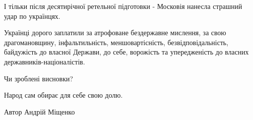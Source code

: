 І тільки після десятирічної ретельної підготовки - Московія нанесла страшний
удар по українцях. 

Українці дорого заплатили за атрофоване бездержавне мислення, за свою
драгомановщину, інфальтильність, меншовартісність, безвідповідальність,
байдужість до власної Держави, до себе, ворожість та упередженість до власних
державників-націоналістів. 

Чи зроблені висновки? 

Народ сам обирає для себе свою долю.

Автор Андрій Міщенко

